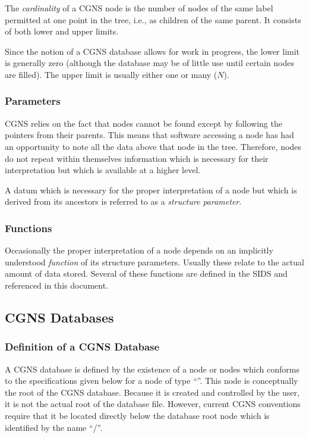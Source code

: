 The \emph{cardinality} of a CGNS node is the number of nodes of the same
label permitted at one point in the tree, i.e., as children of the same
parent. It consists of both lower and upper limits.

Since the notion of a CGNS database allows for work in progress, the
lower limit is generally zero (although the database may be of little
use until certain nodes are filled). The upper limit is usually either
one or many ($N$).

\subsubsection{Parameters}

CGNS relies on the fact that nodes cannot be found except by
following the pointers from their parents.  This means that software
accessing a node has had an opportunity to note all the data above that
node in the tree. Therefore, nodes do not repeat within themselves
information which is necessary for their interpretation but which is
available at a higher level.

A datum which is necessary for the proper interpretation of a
node but which is derived from its ancestors is referred to as a
\textit{structure parameter}.

\subsubsection{Functions}
\label{s:functions}

Occasionally the proper interpretation of a node depends on
an implicitly understood \emph{function} of its structure
parameters. Usually these relate to the actual amount of data
stored. Several of these functions are defined in the SIDS and
referenced in this document.

\subsection{CGNS Databases}
\label{s:cgns_databases}

\subsubsection{Definition of a CGNS Database}

A CGNS database is defined by the existence of a
node or nodes which conforms to the specifications
given below for a node of type ``''.
This node is conceptually the root of the CGNS database. Because it is
created and controlled by the user, it is not the actual root of the
database file.
However, current CGNS conventions require that it be located directly below
the database root node which is identified by the name ``/''.

